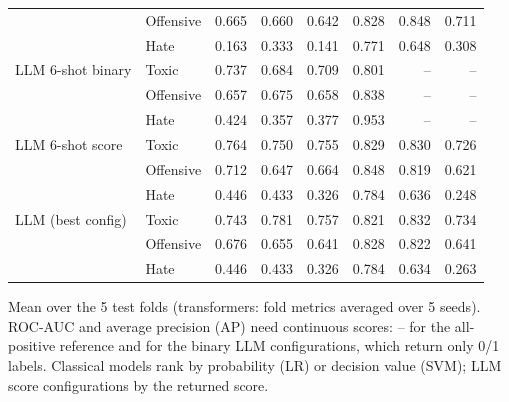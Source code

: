 \begin{table}[htbp]
\begin{tabular}{llrrrrrr}
 & Offensive & 0.665 & 0.660 & 0.642 & 0.828 & 0.848 & 0.711 \\
 & Hate & 0.163 & 0.333 & 0.141 & 0.771 & 0.648 & 0.308 \\
LLM 6-shot binary & Toxic & 0.737 & 0.684 & 0.709 & 0.801 & -- & -- \\
 & Offensive & 0.657 & 0.675 & 0.658 & 0.838 & -- & -- \\
 & Hate & 0.424 & 0.357 & 0.377 & 0.953 & -- & -- \\
LLM 6-shot score & Toxic & 0.764 & 0.750 & 0.755 & 0.829 & 0.830 & 0.726 \\
 & Offensive & 0.712 & 0.647 & 0.664 & 0.848 & 0.819 & 0.621 \\
 & Hate & 0.446 & 0.433 & 0.326 & 0.784 & 0.636 & 0.248 \\
LLM (best config) & Toxic & 0.743 & 0.781 & 0.757 & 0.821 & 0.832 & 0.734 \\
 & Offensive & 0.676 & 0.655 & 0.641 & 0.828 & 0.822 & 0.641 \\
 & Hate & 0.446 & 0.433 & 0.326 & 0.784 & 0.634 & 0.263 \\
\bottomrule
\end{tabular}
\par\smallskip\footnotesize Mean over the 5 test folds (transformers: fold metrics averaged over 5 seeds). ROC-AUC and average precision (AP) need continuous scores: -- for the all-positive reference and for the binary LLM configurations, which return only 0/1 labels. Classical models rank by probability (LR) or decision value (SVM); LLM score configurations by the returned score.
\end{table}
